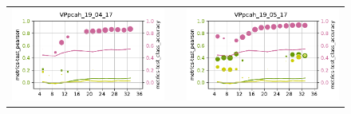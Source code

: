 \begin{figure}
\begin{tabular}{cc|c}
\includegraphics[width=\subplotwidth]{./figures/csp_spoc_incommon/bubble_csp_spoc_incommon_VPpcah_d2_nolegend}& & \includegraphics[width=\subplotwidth]{./figures/csp_spoc_incommon/bubble_csp_spoc_incommon_VPpcah_d4_nolegend}\\

\end{tabular}
\end{figure}
